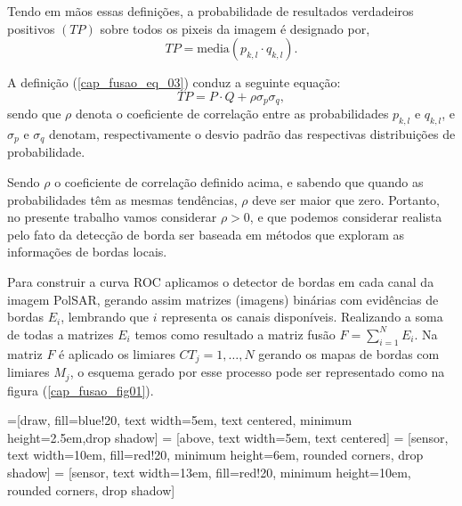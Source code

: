 Tendo em mãos essas definições, a probabilidade de resultados verdadeiros positivos $(TP)$ sobre todos os pixeis da imagem é designado por,
\begin{equation}\label{cap_fusao_eq_03}
TP=\text{media}(p_{k,l}\cdot q_{k,l}).
\end{equation}

A definição (\ref{cap_fusao_eq_03}) conduz a seguinte equação:
\begin{equation}\label{cap_fusao_eq_04}
TP=P \cdot Q + \rho \sigma_p \sigma_q,
\end{equation}
sendo que $\rho$ denota o coeficiente de  correlação entre as probabilidades $p_{k,l}$ e $q_{k,l}$, e $\sigma_p$ e $\sigma_q$ denotam, respectivamente o desvio padrão das respectivas distribuições de probabilidade.

Sendo $\rho$ o coeficiente de correlação definido acima, e sabendo que quando as probabilidades têm as mesmas tendências, $\rho$ deve ser maior que zero. Portanto, no presente trabalho vamos considerar $\rho > 0$, e que podemos considerar realista pelo fato da detecção de borda ser baseada em métodos que exploram as informações de bordas locais.

Para construir a curva ROC aplicamos o detector de bordas em cada canal da imagem PolSAR, gerando assim matrizes (imagens) binárias com evidências de bordas $E_i$, lembrando que $i$ representa os canais disponíveis. Realizando a soma de todas a matrizes $E_i$ temos como resultado a matriz fusão $F=\sum_{i=1}^{N}E_i$. Na matriz $F$ é aplicado os limiares $CT_j=1,\dots,N$ gerando os mapas de bordas com limiares $M_j$, o esquema gerado por esse processo pode ser representado como na figura (\ref{cap_fusao_fig01}).

=[draw, fill=blue!20, text width=5em, 
    text centered, minimum height=2.5em,drop shadow]
 = [above, text width=5em, text centered]
 = [sensor, text width=10em, fill=red!20, 
    minimum height=6em, rounded corners, drop shadow]
 = [sensor, text width=13em, fill=red!20, 
    minimum height=10em, rounded corners, drop shadow]
\def\blockdist{2.3}
\def\edgedist{2.5}

